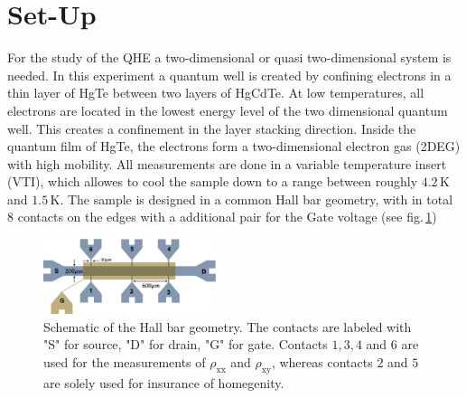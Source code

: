 \section{Set-Up}
For the study of the QHE a two-dimensional or quasi two-dimensional system is needed.
In this experiment a quantum well is created by confining electrons in a thin layer of HgTe between
two layers of HgCdTe. At low temperatures, all electrons are located in the lowest energy level of the 
two dimensional quantum well. This creates a confinement in the layer stacking direction.
Inside the quantum film of HgTe, the electrons form a two-dimensional electron gas (2DEG) with high mobility.
All measurements are done in a variable temperature insert (VTI), which allowes to cool the sample down to a
range between roughly $4.2\,\text{K}$ and $1.5\,\text{K}$. The sample is designed in a common Hall bar geometry,
with in total $8$ contacts on the edges with a additional pair for the Gate voltage (see fig.\,\ref{fig:HallBar})
\begin{figure}[h]
    \centering
    \includegraphics[width=0.45\textwidth]{../Images/HallBar.png}
    \caption{Schematic of the Hall bar geometry. The contacts are labeled with "S" for source, "D" for drain,
    "G" for gate. Contacts $1,3,4$ and $6$ are used for the measurements of $\rho_\text{xx}$ and $\rho_\text{xy}$, 
    whereas contacts $2$ and $5$ are solely used for insurance of homegenity.}
    \label{fig:HallBar}
\end{figure}